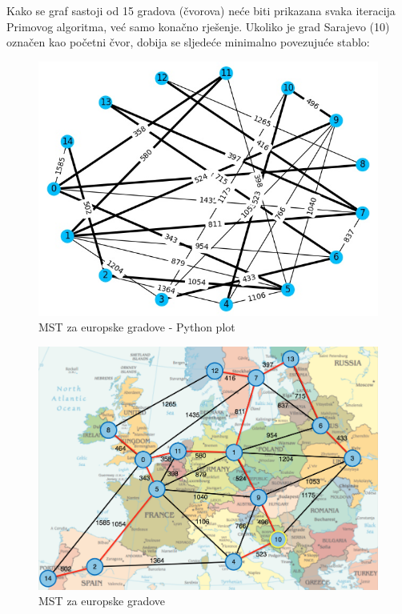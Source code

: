 \documentclass[conference]{IEEEtran}
\begin{document}
Kako se graf sastoji od 15 gradova (čvorova) neće biti prikazana svaka iteracija Primovog algoritma, već samo konačno rješenje. Ukoliko je grad Sarajevo (10) označen kao početni čvor, dobija se sljedeće minimalno povezujuće stablo:

\begin{figure}[H]
\centering
\includegraphics[width=1\linewidth]{slike/gradovi2.jpg}
\caption{MST za europske gradove - Python plot}
\label{figmat}
\end{figure}

\begin{figure}[H]
\centering
\includegraphics[width=1\linewidth]{slike/gradovi-mst2.png}
\caption{MST za europske gradove}
\label{figmat}
\end{figure}
\end{document}
